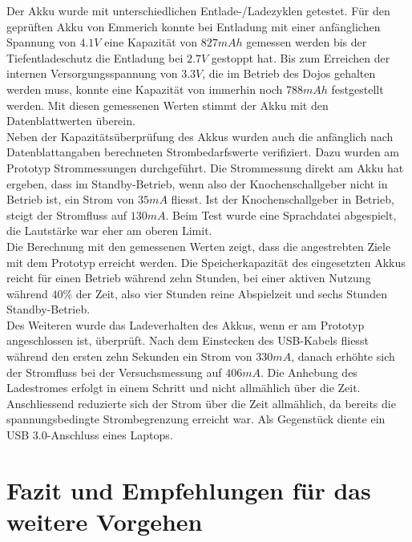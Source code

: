 Der Akku wurde mit unterschiedlichen Entlade-/Ladezyklen getestet. Für den geprüften Akku von Emmerich konnte bei Entladung mit einer anfänglichen Spannung von $4.1V$ eine Kapazität von $827mAh$ gemessen werden bis der Tiefentladeschutz die Entladung bei $2.7V$ gestoppt hat. Bis zum Erreichen der internen Versorgungsspannung von $3.3V$, die im Betrieb des Dojos gehalten werden muss, konnte eine Kapazität von immerhin noch $788mAh$ festgestellt werden. Mit diesen gemessenen Werten stimmt der Akku mit den Datenblattwerten überein.\\

Neben der Kapazitätsüberprüfung des Akkus wurden auch die anfänglich nach Datenblattangaben berechneten Strombedarfswerte verifiziert. Dazu wurden am Prototyp Strommessungen durchgeführt. Die Strommessung direkt am Akku hat ergeben, dass im Standby-Betrieb, wenn also der Knochenschallgeber nicht in Betrieb ist, ein Strom von $35mA$ fliesst. Ist der Knochenschallgeber in Betrieb, steigt der Stromfluss auf $130mA$. Beim Test wurde eine Sprachdatei abgespielt, die Lautstärke war eher am oberen Limit.\\

Die Berechnung mit den gemessenen Werten zeigt, dass die angestrebten Ziele mit dem Prototyp erreicht werden. Die Speicherkapazität des eingesetzten Akkus reicht für einen Betrieb während zehn Stunden, bei einer aktiven Nutzung während $40\%$ der Zeit, also vier Stunden reine Abspielzeit und sechs Stunden Standby-Betrieb.\\

Des Weiteren wurde das Ladeverhalten des Akkus, wenn er am Prototyp angeschlossen ist, überprüft. Nach dem Einstecken des USB-Kabels fliesst während den ersten zehn Sekunden ein Strom von $330mA$, danach erhöhte sich der Stromfluss bei der Versuchsmessung auf $406mA$. Die Anhebung des Ladestromes erfolgt in einem Schritt und nicht allmählich über die Zeit. Anschliessend reduzierte sich der Strom über die Zeit allmählich, da bereits die spannungsbedingte Strombegrenzung erreicht war. Als Gegenstück diente ein USB 3.0-Anschluss eines Laptops.\\




\section{Fazit und Empfehlungen für das weitere Vorgehen}

